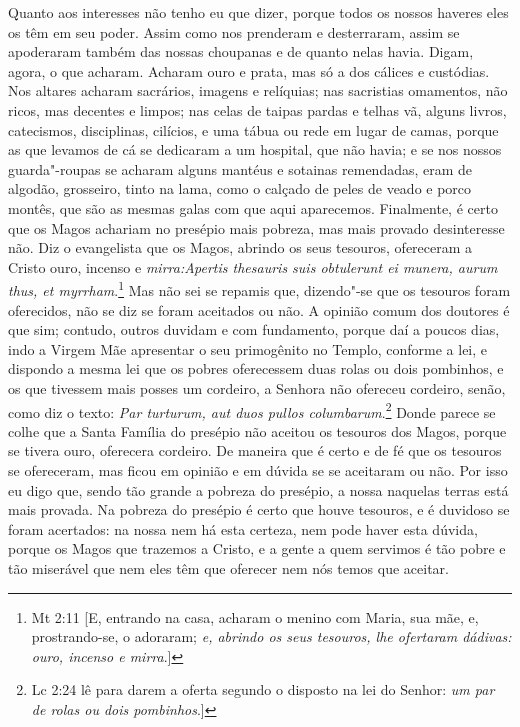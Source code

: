 Quanto aos interesses não tenho eu que dizer, porque todos os nossos
haveres eles os têm em seu poder. Assim como nos prenderam e
desterraram, assim se apoderaram também das nossas choupanas e de quanto
nelas havia. Digam, agora, o que acharam. Acharam ouro e prata, mas só a
dos cálices e custódias. Nos altares acharam sacrários, imagens e
relíquias; nas sacristias omamentos, não ricos, mas decentes e limpos;
nas celas de taipas pardas e telhas vã, alguns livros, catecismos,
disciplinas, cilícios, e uma tábua ou rede em lugar de camas, porque as
que levamos de cá se dedicaram a um hospital, que não havia; e se nos
nossos guarda"-roupas se acharam alguns mantéus e sotainas remendadas,
eram de algodão, grosseiro, tinto na lama, como o calçado de peles de
veado e porco montês, que são as mesmas galas com que aqui aparecemos.
Finalmente, é certo que os Magos achariam no presépio mais pobreza, mas
mais provado desinteresse não. Diz o evangelista que os Magos, abrindo
os seus tesouros, ofereceram a Cristo ouro, incenso e
\emph{mirra:Apertis thesauris suis obtulerunt ei munera, aurum thus, et
myrrham}.\footnote{Mt 2:11 [E, entrando na casa, acharam o menino com Maria, sua mãe, e, prostrando-se, o adoraram; \emph{e, abrindo os seus tesouros, lhe ofertaram dádivas: ouro, incenso e mirra}.]} Mas não sei se repamis que, dizendo"-se que os 
tesouros foram oferecidos, não se diz se foram aceitados ou não. A
opinião comum dos doutores é que sim; contudo, outros duvidam e com
fundamento, porque daí a poucos dias, indo a Virgem Mãe apresentar o seu
primogênito no Templo, conforme a lei, e dispondo a mesma lei que os
pobres oferecessem duas rolas ou dois pombinhos, e os que tivessem mais
posses um cordeiro, a Senhora não ofereceu cordeiro, senão, como diz o
texto: \emph{Par turturum, aut duos pullos columbarum}.\footnote{Lc 2:24 lê para darem a oferta segundo o disposto na lei do Senhor: \emph{um par de rolas ou dois
pombinhos}.]}
Donde parece se colhe que a Santa Família do presépio não aceitou os
tesouros dos Magos, porque se tivera ouro, oferecera cordeiro. De
maneira que é certo e de fé que os tesouros se ofereceram, mas ficou em
opinião e em dúvida se se aceitaram ou não. Por isso eu digo que, sendo
tão grande a pobreza do presépio, a nossa naquelas terras está mais
provada. Na pobreza do presépio é certo que houve tesouros, e é duvidoso
se foram acertados: na nossa nem há esta certeza, nem pode haver esta
dúvida, porque os Magos que trazemos a Cristo, e a gente a quem servimos
é tão pobre e tão miserável que nem eles têm que oferecer nem nós temos
que aceitar.

